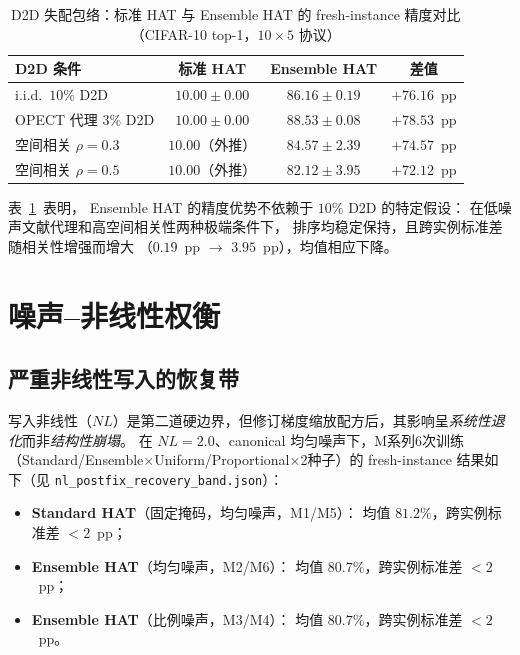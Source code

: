 \begin{table}[t]
\centering
\caption{D2D 失配包络：标准 HAT 与 Ensemble HAT 的 fresh-instance 精度对比（CIFAR-10 top-1，$10 \times 5$ 协议）}
\label{tab:d2d-envelope}
\small
\begin{tabular}{@{}lccc@{}}
\toprule
\textbf{D2D 条件} & \textbf{标准 HAT} & \textbf{Ensemble HAT} & \textbf{差值} \\
\midrule
i.i.d.~$10\%$ D2D & $10.00\pm0.00$ & $86.16\pm0.19$ & $+76.16$~pp \\
OPECT 代理 $3\%$ D2D & $10.00\pm0.00$ & $88.53\pm0.08$ & $+78.53$~pp \\
空间相关 $\rho=0.3$ & $10.00$（外推） & $84.57\pm2.39$ & $+74.57$~pp \\
空间相关 $\rho=0.5$ & $10.00$（外推） & $82.12\pm3.95$ & $+72.12$~pp \\
\bottomrule
\end{tabular}
\end{table}

表~\ref{tab:d2d-envelope}~表明，
Ensemble HAT 的精度优势不依赖于 $10\%$ D2D 的特定假设：
在低噪声文献代理和高空间相关性两种极端条件下，
排序均稳定保持，且跨实例标准差随相关性增强而增大
（$0.19$~pp $\to$ $3.95$~pp），均值相应下降。


\section{噪声--非线性权衡}
\label{sec:noise-nl-tradeoff}

\subsection{严重非线性写入的恢复带}

写入非线性（$NL$）是第二道硬边界，但修订梯度缩放配方后，其影响呈\emph{系统性退化}而非\emph{结构性崩塌}。
在 $NL=2.0$、canonical 均匀噪声下，M系列6次训练（Standard/Ensemble$\times$Uniform/Proportional$\times$2种子）的 fresh-instance 结果如下（见 \texttt{nl\_postfix\_recovery\_band.json}）：

\begin{itemize}
    \item \textbf{Standard HAT}（固定掩码，均匀噪声，M1/M5）：
    均值 $\mathbf{81.2\%}$，跨实例标准差 $<2$~pp；
    \item \textbf{Ensemble HAT}（均匀噪声，M2/M6）：
    均值 $\mathbf{80.7\%}$，跨实例标准差 $<2$~pp；
    \item \textbf{Ensemble HAT}（比例噪声，M3/M4）：
    均值 $\mathbf{80.7\%}$，跨实例标准差 $<2$~pp。
\end{itemize}

